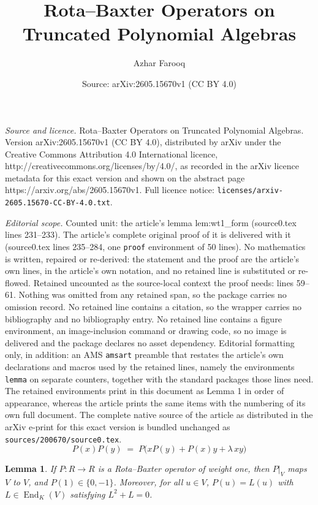 \documentclass[10pt,a4paper]{amsart}
\title{Rota--Baxter Operators on Truncated Polynomial Algebras}
\author{Azhar Farooq}
\date{Source: arXiv:2605.15670v1 (CC BY 4.0)}
\newtheorem{lemma}{Lemma}
\DeclareMathOperator{\End}{End}
\begin{document}
\maketitle

\noindent\emph{Source and licence.} Rota--Baxter Operators on Truncated Polynomial Algebras. Version arXiv:2605.15670v1 (CC BY 4.0), distributed by arXiv under the Creative Commons Attribution 4.0 International licence, http://creativecommons.org/licenses/by/4.0/, as recorded in the arXiv licence metadata for this exact version and shown on the abstract page https://arxiv.org/abs/2605.15670v1. Full licence notice: \texttt{licenses/arxiv-2605.15670-CC-BY-4.0.txt}.\par\smallskip

\noindent\textit{Editorial scope.} Counted unit: the article's lemma lem:wt1\_form (source0.tex lines 231--233). The article's complete original proof of it is delivered with it (source0.tex lines 235--284, one \texttt{proof} environment of 50 lines). No mathematics is written, repaired or re-derived: the statement and the proof are the article's own lines, in the article's own notation, and no retained line is substituted or re-flowed.  Retained uncounted as the source-local context the proof needs: lines 59--61.  Nothing was omitted from any retained span, so the package carries no omission record.  No retained line contains a citation, so the wrapper carries no bibliography and no bibliography entry.  No retained line contains a figure environment, an image-inclusion command or drawing code, so no image is delivered and the package declares no asset dependency.  Editorial formatting only, in addition: an AMS \texttt{amsart} preamble that restates the article's own declarations and macros used by the retained lines, namely the environments \texttt{lemma} on separate counters, together with the standard packages those lines need.  The retained environments print in this document as Lemma 1 in order of appearance, whereas the article prints the same items with the numbering of its own full document.  The complete native source of the article as distributed in the arXiv e-print for this exact version is bundled unchanged as \texttt{sources/200670/source0.tex}.
\begin{equation}\label{RBdef}
    P(x)P(y) \;=\; P\bigl(xP(y)+P(x)y + \lambda\,xy\bigr)
\end{equation}

\begin{lemma}\label{lem:wt1_form}
If $P : R \to R$ is a Rota--Baxter operator of weight one, then $P|_V$ maps $V$ to $V$, and  $P(1) \in \{0, -1\}$.  Moreover, for all $u \in V$, $P(u) = L(u)$ with $L \in \End_K(V)$ satisfying $L^2 + L = 0$.
\end{lemma}
\end{document}
